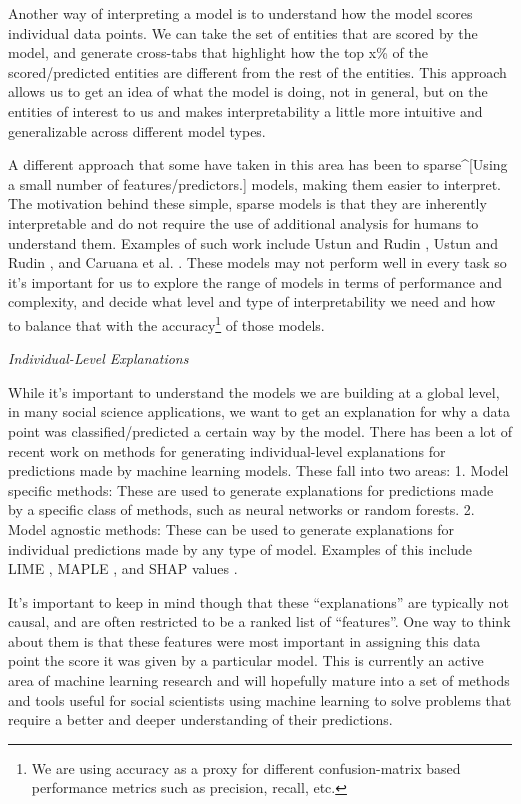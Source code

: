 \documentclass[]{krantz}
\begin{document}
Another way of interpreting a model is to understand how the model
scores individual data points. We can take the set of entities that are
scored by the model, and generate cross-tabs that highlight how the top
x\% of the scored/predicted entities are different from the rest of the
entities. This approach allows us to get an idea of what the model is
doing, not in general, but on the entities of interest to us and makes
interpretability a little more intuitive and generalizable across
different model types.

A different approach that some have taken in this area has been to
sparse\^{}{[}Using a small number of features/predictors.{]} models,
making them easier to interpret. The motivation behind these simple,
sparse models is that they are inherently interpretable and do not
require the use of additional analysis for humans to understand them.
Examples of such work include Ustun and Rudin \citeyearpar{Ustun2019},
Ustun and Rudin \citeyearpar{Ustun2016}, and Caruana et al.
\citeyearpar{Caruana2015}. These models may not perform well in every
task so it's important for us to explore the range of models in terms of
performance and complexity, and decide what level and type of
interpretability we need and how to balance that with the
accuracy\footnote{We are using accuracy as a proxy for different
  confusion-matrix based performance metrics such as precision, recall,
  etc.} of those models.

\emph{Individual-Level Explanations}

While it's important to understand the models we are building at a
global level, in many social science applications, we want to get an
explanation for why a data point was classified/predicted a certain way
by the model. There has been a lot of recent work on methods for
generating individual-level explanations for predictions made by machine
learning models. These fall into two areas: 1. Model specific methods:
These are used to generate explanations for predictions made by a
specific class of methods, such as neural networks or random forests. 2.
Model agnostic methods: These can be used to generate explanations for
individual predictions made by any type of model. Examples of this
include LIME \citep{ribeiro-16}, MAPLE \citep{Plumb2018}, and SHAP
values \citep{Lundberg2017}.

It's important to keep in mind though that these ``explanations'' are
typically not causal, and are often restricted to be a ranked list of
``features''. One way to think about them is that these features were
most important in assigning this data point the score it was given by a
particular model. This is currently an active area of machine learning
research and will hopefully mature into a set of methods and tools
useful for social scientists using machine learning to solve problems
that require a better and deeper understanding of their predictions.
\end{document}
